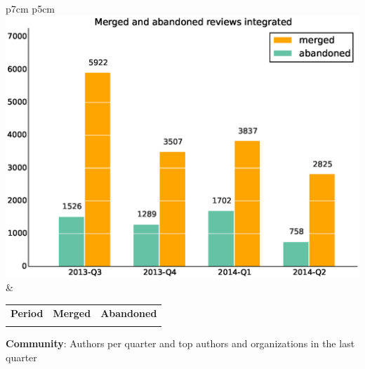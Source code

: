 \documentclass[a4wide,11pt]{report}
\begin{document}
\begin{tabular}{p{7cm} p{5cm}}
    \vspace{0pt} 
    \includegraphics[scale=.35]{figs/submitted_reviewsintegrated.eps}
    & 
    \vspace{0pt}
    \begin{tabular}{l|r|r|}%
    \bfseries Period & \bfseries Merged & \bfseries Abandoned %
    \csvreader[head to column names]{data/submitted_reviewsintegrated.csv}{}%
    {\\ & \merged & \abandoned}
    \end{tabular}
\end{tabular}


\textbf{Community}: Authors per quarter and top authors and organizations in the last quarter
\end{document}
